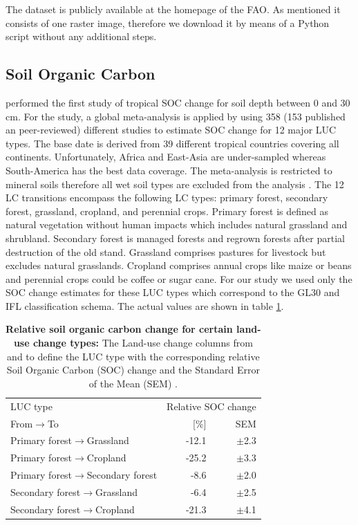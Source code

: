 		The dataset is publicly available at the homepage of the \ac{FAO}. As mentioned it consists of one raster image, therefore we download it by means of a Python script without any additional steps.

	\subsection{Soil Organic Carbon}
		\citeauthor{Don2010} performed the first study of tropical \ac{SOC} change for soil depth between 0 and 30 cm. For the study, a global meta-analysis is applied by using 358 (153 published an peer-reviewed) different studies to estimate \ac{SOC} change for 12 major \ac{LUC} types. The base date is derived from 39 different tropical countries covering all continents. Unfortunately, Africa and East-Asia are under-sampled whereas South-America has the best data coverage. The meta-analysis is restricted to mineral soils therefore all wet soil types are excluded from the analysis \citeauthor{Don2010}. The 12 \ac{LC} transitions encompass the following \ac{LC} types: primary forest, secondary forest, grassland, cropland, and perennial crops. Primary forest is defined as natural vegetation without human impacts which includes natural grassland and shrubland. Secondary forest is managed forests and regrown forests after partial destruction of the old stand. Grassland comprises pastures for livestock but excludes natural grasslands. Cropland comprises annual crops like maize or beans and perennial crops could be coffee or sugar cane. For our study we used only the \ac{SOC} change estimates for these \ac{LUC} types which correspond to the \ac{GL30} and \ac{IFL} classification schema. The actual values are shown in table \ref{tab:soc_factors}.
		\begin{table}[ht]
			\centering
			\caption[Relative soil organic carbon change for certain land-use change types]{\textbf{Relative soil organic carbon change for certain land-use change types:} The Land-use change columns from and to define the LUC type with the corresponding relative Soil Organic Carbon (SOC) change and the Standard Error of the Mean (SEM) \citep{Don2010}.}
			\label{tab:soc_factors}
			\begin{tabular}{lrr}
				\hline
				LUC type & \multicolumn{2}{c}{Relative SOC change} \\
				From$\rightarrow$To & [\%] & SEM \\\hline
				Primary forest$\rightarrow$Grassland & -12.1 & $\pm$2.3 \\
				Primary forest$\rightarrow$Cropland & -25.2 & $\pm$3.3 \\
				Primary forest$\rightarrow$Secondary forest & -8.6 & $\pm$2.0 \\
				Secondary forest$\rightarrow$Grassland & -6.4 & $\pm$2.5 \\
				Secondary forest$\rightarrow$Cropland & -21.3 & $\pm$4.1 \\\hline
			\end{tabular}
		\end{table}

